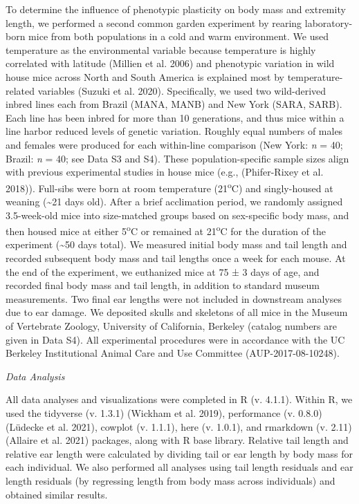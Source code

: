\documentclass[
]{article}
\begin{document}
To determine the influence of phenotypic plasticity on body mass and
extremity length, we performed a second common garden experiment by
rearing laboratory-born mice from both populations in a cold and warm
environment. We used temperature as the environmental variable because
temperature is highly correlated with latitude (Millien et al. 2006) and
phenotypic variation in wild house mice across North and South America
is explained most by temperature-related variables (Suzuki et al. 2020).
Specifically, we used two wild-derived inbred lines each from Brazil
(MANA, MANB) and New York (SARA, SARB). Each line has been inbred for
more than 10 generations, and thus mice within a line harbor reduced
levels of genetic variation. Roughly equal numbers of males and females
were produced for each within-line comparison (New York: \emph{n} = 40;
Brazil: \emph{n} = 40; see Data S3 and S4). These population-specific
sample sizes align with previous experimental studies in house mice
(e.g., (Phifer-Rixey et al. 2018)). Full-sibs were born at room
temperature (21\textsuperscript{o}C) and singly-housed at weaning
(\textasciitilde21 days old). After a brief acclimation period, we
randomly assigned 3.5-week-old mice into size-matched groups based on
sex-specific body mass, and then housed mice at either
5\textsuperscript{o}C or remained at 21\textsuperscript{o}C for the
duration of the experiment (\textasciitilde50 days total). We measured
initial body mass and tail length and recorded subsequent body mass and
tail lengths once a week for each mouse. At the end of the experiment,
we euthanized mice at 75 ± 3 days of age, and recorded final body mass
and tail length, in addition to standard museum measurements. Two final
ear lengths were not included in downstream analyses due to ear damage.
We deposited skulls and skeletons of all mice in the Museum of
Vertebrate Zoology, University of California, Berkeley (catalog numbers
are given in Data S4). All experimental procedures were in accordance
with the UC Berkeley Institutional Animal Care and Use Committee
(AUP-2017-08-10248).

\vspace{3.5mm}

\noindent\emph{Data Analysis}

All data analyses and visualizations were completed in R (v. 4.1.1).
Within R, we used the tidyverse (v. 1.3.1) (Wickham et al. 2019),
performance (v. 0.8.0) (Lüdecke et al. 2021), cowplot (v. 1.1.1), here
(v. 1.0.1), and rmarkdown (v. 2.11) (Allaire et al. 2021) packages,
along with R base library. Relative tail length and relative ear length
were calculated by dividing tail or ear length by body mass for each
individual. We also performed all analyses using tail length residuals
and ear length residuals (by regressing length from body mass across
individuals) and obtained similar results.
\end{document}
